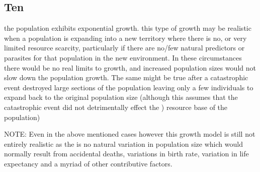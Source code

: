 \documentclass[]{article}
\begin{document}
\hypertarget{ten}{%
\subsection{Ten}\label{ten}}

the population exhibits exponential growth. this type of growth may be
realistic when a population is expanding into a new territory where
there is no, or very limited resource scarcity, particularly if there
are no/few natural predictors or parasites for that population in the
new environment. In these circumstances there would be no real limits to
growth, and increased population sizes would not slow down the
population growth. The same might be true after a catastrophic event
destroyed large sections of the population leaving only a few
individuals to expand back to the original population size (although
this assumes that the catastrophic event did not detrimentally effect
the ) resource base of the population)

NOTE: Even in the above mentioned cases however this growth model is
still not entirely realistic as the is no natural variation in
population size which would normally result from accidental deaths,
variations in birth rate, variation in life expectancy and a myriad of
other contributive factors.
\end{document}
